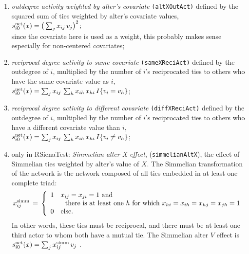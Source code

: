 \documentclass[a4paper,fleqn,11pt]{article}
\newcommand{\+}{\, + \,}
\newcommand{\vit}{\theenumi}
\begin{document}
\begin{enumerate}
 \item {\em outdegree activity weighted by alter's covariate}
  \texttt{(altXOutAct)} defined by the
 squared sum of ties weighted by alter's covariate values,\\
 $s^{\rm net}_{i\vit}(x) = \big(\sum_j x_{ij} \,v_j \big)^2 $;\\
 since the covariate here is used as a weight, this probably
 makes sense especially for non-centered covariates;


 \item {\em reciprocal degree activity to same covariate}
\texttt{(sameXReciAct)} defined by the outdegree of $i$,
 multiplied by the number of $i$'s reciprocated ties
 to others who have the same covariate value as $i$,\\
 $s^{\rm net}_{i\vit}(x) =  \sum_j x_{ij}\,
                \sum_h x_{ih}\,x_{hi}\, I\{v_i = v_h \} $;

 \item {\em reciprocal degree activity to different covariate}
\texttt{(diffXReciAct)} defined by the outdegree of $i$,
 multiplied by the number of $i$'s reciprocated ties
 to others who have a different covariate value than $i$,\\
 $s^{\rm net}_{i\vit}(x) =  \sum_j x_{ij}\,
                \sum_h x_{ih}\,x_{hi}\, I\{v_i \neq v_h \} $;


\item only in RSienaTest:  \emph{Simmelian alter X effect}, (\texttt{simmelianAltX}), the effect of
      Simmelian ties weighted by alter's value of $X$. The Simmelian transformation of the network is
      the network composed of all ties embedded in at least one complete triad:
\[
    x^{\rm{simm}}_{ij} \,=\, \left\{ \begin{array}{cl}
                               1 & x_{ij} = x_{ji} = 1 \text{ and} \\
                                  & \ \text{ there is at least one }
                                      h \text{ for which } x_{hi} = x_{ih} = x_{hj} = x_{jh} = 1 \\
                               0 & \text{else.}
                             \end{array} \right.
\]
      In other words, these ties must be reciprocal, and there must be at least one
      third actor to whom both have a mutual tie.
      The Simmelian alter $V$ effect  is  \\
$s^{\rm net}_{i\vit}(x ) = \sum_j  x^{\rm{simm}}_{ij}\,v_j $ .



\end{enumerate}
\end{document}

